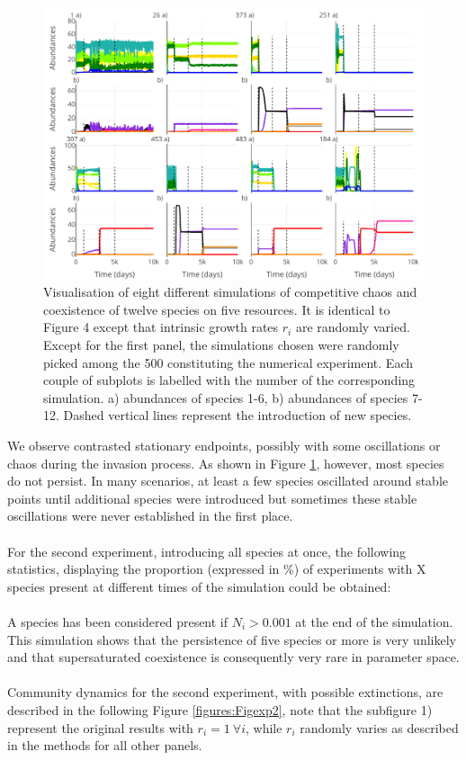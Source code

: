 \begin{figure}[H]
\begin{center} 
 \includegraphics[width=1\textwidth]{../Code/Figures/Figure_exp1.pdf}
  \caption{Visualisation of eight different simulations of competitive chaos and coexistence of twelve species on five resources. It is identical to Figure 4 except that intrinsic growth rates $r_i$ are randomly varied. Except for the first panel, the simulations chosen were randomly picked among the 500 constituting the numerical experiment. Each couple of subplots is labelled with the number of the corresponding simulation. a) abundances of species 1-6, b) abundances of species 7-12. Dashed vertical lines represent the introduction of new species.}
  \label{figures:Figexp1}
\end{center}
\end{figure}

We observe contrasted stationary endpoints, possibly with some oscillations or chaos during the invasion process. As shown in Figure \ref{figures:Figexp1}, however, most species do not persist. In many scenarios, at least a few species oscillated around stable points until additional species were introduced but sometimes these stable oscillations were never established in the first place.\\
\\
For the second experiment, introducing all species at once, the following statistics, displaying the proportion (expressed in \%) of experiments with X species present at different times of the simulation could be obtained:\\

\\
A species has been considered present if $N_i > 0.001$ at the end of the simulation. This simulation shows that the persistence of five species or more is very unlikely and that supersaturated coexistence is consequently very rare in parameter space.\\
\\
Community dynamics for the second experiment, with possible extinctions, are described in the following Figure \ref{figures:Figexp2}, note that the subfigure 1) represent the original results with $r_i=1 ~\forall i$, while $r_i$ randomly varies as described in the methods for all other panels.

